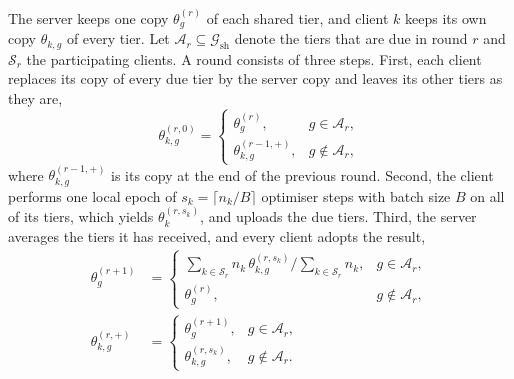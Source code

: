 \documentclass[journal]{IEEEtran}
\begin{document}
The server keeps one copy $\theta_g^{(r)}$ of each shared tier, and client $k$ keeps its own copy $\theta_{k,g}$ of every tier. Let $\mathcal A_r\subseteq\mathcal G_{\mathrm{sh}}$ denote the tiers that are due in round $r$ and $\mathcal S_r$ the participating clients. A round consists of three steps. First, each client replaces its copy of every due tier by the server copy and leaves its other tiers as they are,
\begin{equation}
\theta_{k,g}^{(r,0)}=\begin{cases}\theta_g^{(r)}, & g\in\mathcal A_r,\\ \theta_{k,g}^{(r-1,+)}, & g\notin\mathcal A_r,\end{cases}
\label{eq:restart}
\end{equation}
where $\theta_{k,g}^{(r-1,+)}$ is its copy at the end of the previous round. Second, the client performs one local epoch of $s_k=\lceil n_k/B\rceil$ optimiser steps with batch size $B$ on all of its tiers, which yields $\theta_k^{(r,s_k)}$, and uploads the due tiers. Third, the server averages the tiers it has received, and every client adopts the result,
\begin{align}
\theta_g^{(r+1)}&=\begin{cases}\sum_{k\in\mathcal S_r}n_k\,\theta_{k,g}^{(r,s_k)}\big/\sum_{k\in\mathcal S_r}n_k, & g\in\mathcal A_r,\\ \theta_g^{(r)}, & g\notin\mathcal A_r,\end{cases}
\label{eq:agg}\\
\theta_{k,g}^{(r,+)}&=\begin{cases}\theta_g^{(r+1)}, & g\in\mathcal A_r,\\ \theta_{k,g}^{(r,s_k)}, & g\notin\mathcal A_r.\end{cases}
\label{eq:adopt}
\end{align}
\end{document}
